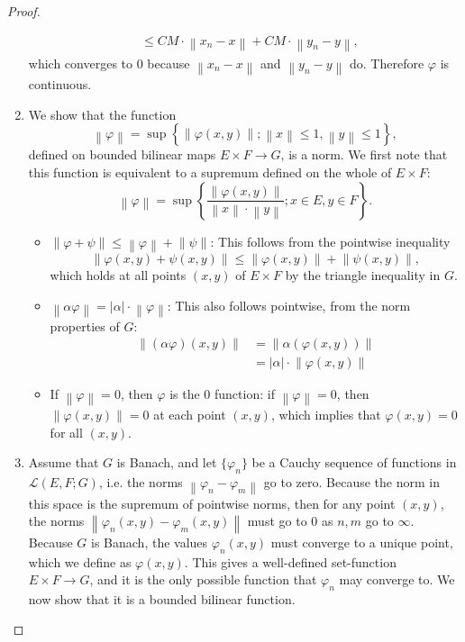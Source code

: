 \documentclass[12pt]{article}
\theoremstyle{definition}
\begin{document}
\begin{proof}
\begin{enumerate}[label=(\roman*)]
\begin{align*}
				&\leq CM \cdot \left \lVert { x_n - x } \right \lVert + CM \cdot \left \lVert { y_n - y } \right \lVert,
			\end{align*} which converges to $0$ because $\left \lVert { x_n - x } \right \lVert $ and $\left \lVert { y_n - y } \right \lVert $ do. Therefore $\varphi$ is continuous.
		\item We show that the function
			\[ \left \lVert {  \varphi } \right \lVert = \sup\left\{ \left \lVert { \varphi(x,y) } \right \lVert ; \left \lVert { x } \right \lVert  \leq 1 , \left \lVert { y } \right \lVert \leq 1\right \},\]
			defined on bounded bilinear maps $E\times F \to G$, is a norm. We first note that this function is equivalent to a supremum defined on the whole of $E \times F$:
			\[ \left \lVert { \varphi } \right \lVert  = \sup\left\{ \frac{\left \lVert { \varphi(x,y) } \right \lVert }{\left \lVert { x } \right \lVert \cdot \left \lVert { y } \right \lVert }; x \in E, y \in F \right\}.\]
			\begin{itemize}
				\item $\left \lVert { \varphi + \psi } \right \lVert \leq \left \lVert {  \varphi } \right \lVert  + \left \lVert { \psi } \right \lVert $: This follows from the pointwise inequality
					\[\left \lVert { \varphi(x,y) + \psi(x,y) } \right \lVert \leq \left \lVert { \varphi(x,y) } \right \lVert + \left \lVert { \psi(x,y) } \right \lVert,\]
					which holds at all points $(x,y)$ of $E\times F$ by the triangle inequality in $G$.
				\item $\left \lVert { \alpha \varphi } \right \lVert  = \left \lvert { \alpha } \right \lvert \cdot \left \lVert { \varphi} \right \lVert $: This also follows pointwise, from the norm properties of $G$:
					\begin{align*}
						\left \lVert { (\alpha \varphi)(x,y) } \right \lVert &= \left \lVert { \alpha (\varphi(x,y)) } \right \lVert \\
						&= \left \lvert { \alpha } \right \lvert \cdot \left \lVert { \varphi(x,y) } \right \lVert 
					\end{align*}
				\item If $\left \lVert {  \varphi } \right \lVert = 0$, then $\varphi$ is the $0$ function: if $\left \lVert { \varphi } \right \lVert = 0$, then $\left \lVert { \varphi(x,y) } \right \lVert = 0$ at each point $(x,y)$, which implies that $\varphi(x,y) = 0$ for all $(x,y)$.
			\end{itemize}
		\item Assume that $G$ is Banach, and let $\{\varphi_n\}$ be a Cauchy sequence of functions in $\mathcal L(E,F;G)$, i.e. the norms $\left \lVert { \varphi_n - \varphi_m } \right \lVert $ go to zero. Because the norm in this space is the supremum of pointwise norms, then for any point $(x,y)$, the norms $\left \lVert { \varphi_n(x,y) - \varphi_m(x,y) } \right \lVert$ must go to $0$ as $n, m $ go to $\infty$. Because $G$ is Banach, the values $\varphi_n(x,y)$ must converge to a unique point, which we define as $\varphi(x,y)$. This gives a well-defined set-function $E\times F \to G$, and it is the only possible function that $\varphi_n$ may converge to. We now show that it is a bounded bilinear function.

\end{enumerate}
\end{proof}
\end{document}
